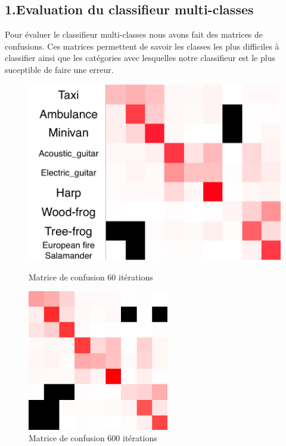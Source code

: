 \documentclass[a4paper,11pt]{report}
\begin{document}
\subsection*{1.Evaluation du classifieur multi-classes}
Pour évaluer le classifieur multi-classes nous avons fait des matrices de confusions. Ces matrices permettent de savoir les classes les plus difficiles à classifier ainsi que les catégories avec lesquelles notre classifieur est le plus suceptible de faire une erreur.\\

\begin{figure}[H]
\centering

\begin{minipage}{.4\textwidth}
\centering
\includegraphics[width=1\textwidth ]{mc60}\caption{Matrice de confusion 60 itérations}
\end{minipage}
\begin{minipage}{.5\textwidth}
\centering
\includegraphics[width=0.55\textwidth]{mc600}\caption{Matrice de confusion 600 itérations}
\end{minipage}

\end{figure}
\end{document}
